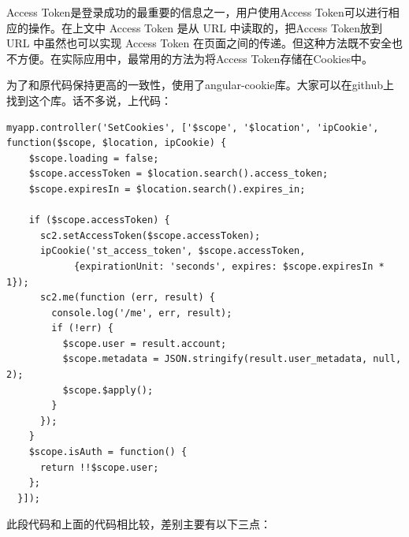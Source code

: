 \documentclass[]{ctexbook}
\begin{document}
Access Token是登录成功的最重要的信息之一，用户使用Access Token可以进行相应的操作。在上文中 Access Token 是从 URL 中读取的，把Access Token放到 URL 中虽然也可以实现 Access Token 在页面之间的传递。但这种方法既不安全也不方便。在实际应用中，最常用的方法为将Access Token存储在Cookies中。

为了和原代码保持更高的一致性，使用了angular-cookie库。大家可以在github上找到这个库。话不多说，上代码：

\begin{verbatim}
myapp.controller('SetCookies', ['$scope', '$location', 'ipCookie', function($scope, $location, ipCookie) {
    $scope.loading = false;    
    $scope.accessToken = $location.search().access_token;
    $scope.expiresIn = $location.search().expires_in;

    if ($scope.accessToken) {
      sc2.setAccessToken($scope.accessToken);
      ipCookie('st_access_token', $scope.accessToken, 
            {expirationUnit: 'seconds', expires: $scope.expiresIn * 1});
      sc2.me(function (err, result) {
        console.log('/me', err, result);
        if (!err) {
          $scope.user = result.account;
          $scope.metadata = JSON.stringify(result.user_metadata, null, 2);
          $scope.$apply();
        }
      });
    }
    $scope.isAuth = function() {
      return !!$scope.user;
    };
  }]);
\end{verbatim}

此段代码和上面的代码相比较，差别主要有以下三点：
\end{document}
